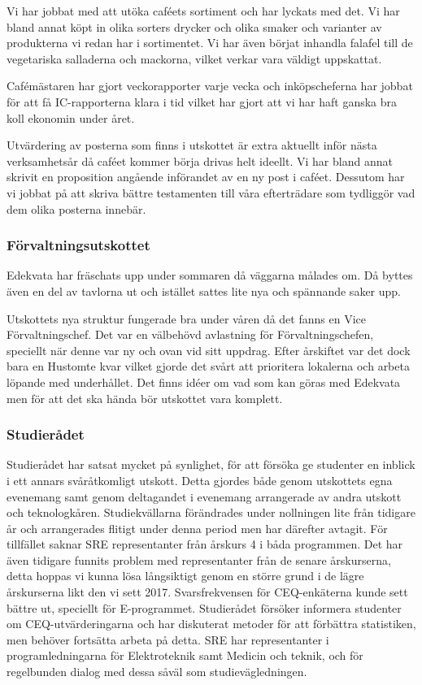 \documentclass[../_main/handlingar.tex]{subfiles}
\begin{document}
Vi har jobbat med att utöka caféets sortiment och har lyckats med det. Vi har bland annat köpt in olika sorters drycker och olika smaker och varianter av produkterna vi redan har i sortimentet. Vi har även börjat inhandla falafel till de vegetariska salladerna och mackorna, vilket verkar vara väldigt uppskattat.

Cafémästaren har gjort veckorapporter varje vecka och inköpscheferna har jobbat för att få IC-rapporterna klara i tid vilket har gjort att vi har haft ganska bra koll ekonomin under året.

Utvärdering av posterna som finns i utskottet är extra aktuellt inför nästa verksamhetsår då caféet kommer börja drivas helt ideellt. Vi har bland annat skrivit en proposition angående införandet av en ny post i caféet. Dessutom har vi jobbat på att skriva bättre testamenten till våra efterträdare som tydliggör vad dem olika posterna innebär.

\subsubsection*{Förvaltningsutskottet}
Edekvata har fräschats upp under sommaren då väggarna målades om. Då byttes även en del av tavlorna ut och istället sattes lite nya och spännande saker upp.

Utskottets nya struktur fungerade bra under våren då det fanns en Vice Förvaltningschef. Det var en välbehövd avlastning för Förvaltningschefen, speciellt när denne var ny och ovan vid sitt uppdrag. Efter årskiftet var det dock bara en Hustomte kvar vilket gjorde det svårt att prioritera lokalerna och arbeta löpande med underhållet. Det finns idéer om vad som kan göras med Edekvata men för att det ska hända bör utskottet vara komplett.

\subsubsection*{Studierådet}
Studierådet har satsat mycket på synlighet, för att försöka ge studenter en inblick i ett annars svåråtkomligt utskott. Detta gjordes både genom utskottets egna evenemang samt genom deltagandet i evenemang arrangerade av andra utskott och teknologkåren. Studiekvällarna förändrades under nollningen lite från tidigare år och arrangerades flitigt under denna period men har därefter avtagit. För tillfället saknar SRE representanter från årskurs 4 i båda programmen. Det har även tidigare funnits problem med representanter från de senare årskurserna, detta hoppas vi kunna lösa långsiktigt genom en större grund i de lägre årskurserna likt den vi sett 2017. Svarsfrekvensen för CEQ-enkäterna kunde sett bättre ut, speciellt för E-programmet. Studierådet försöker informera studenter om CEQ-utvärderingarna och har diskuterat metoder för att förbättra statistiken, men behöver fortsätta arbeta på detta. SRE har representanter i programledningarna för Elektroteknik samt Medicin och teknik, och för regelbunden dialog med dessa såväl som studievägledningen.
\end{document}
